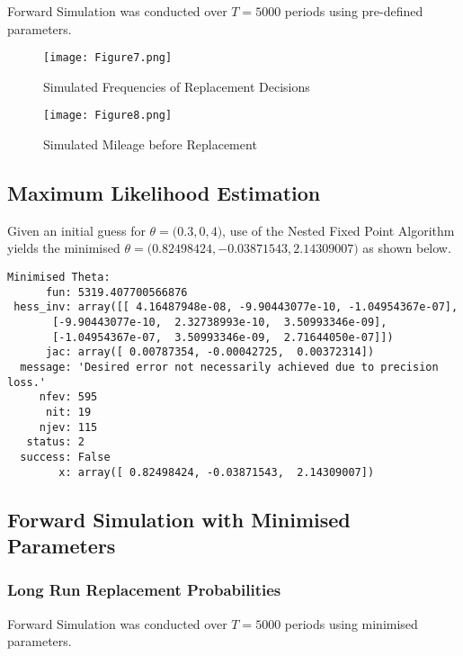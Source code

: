 \documentclass{article}
\begin{document}
Forward Simulation was conducted over $T=5000$ periods using pre-defined parameters.

\begin{figure}[h]
\begin{center}
\texttt{[image: Figure7.png]}
\caption{Simulated Frequencies of Replacement Decisions}
\end{center}
\end{figure}
\FloatBarrier

\begin{figure}[h]
\begin{center}
\texttt{[image: Figure8.png]}
\caption{Simulated Mileage before Replacement}
\end{center}
\end{figure}
\FloatBarrier

\subsection{Maximum Likelihood Estimation}

Given an initial guess for $\theta = \big( 0.3, 0, 4 \big)$, use of the Nested Fixed Point Algorithm yields the minimised $\theta = \big( 0.82498424, -0.03871543,  2.14309007 \big)$ as shown below.

\begin{lstlisting}
Minimised Theta:
      fun: 5319.407700566876
 hess_inv: array([[ 4.16487948e-08, -9.90443077e-10, -1.04954367e-07],
       [-9.90443077e-10,  2.32738993e-10,  3.50993346e-09],
       [-1.04954367e-07,  3.50993346e-09,  2.71644050e-07]])
      jac: array([ 0.00787354, -0.00042725,  0.00372314])
  message: 'Desired error not necessarily achieved due to precision loss.'
     nfev: 595
      nit: 19
     njev: 115
   status: 2
  success: False
        x: array([ 0.82498424, -0.03871543,  2.14309007])
\end{lstlisting}

\subsection{Forward Simulation with Minimised Parameters}

\subsubsection{Long Run Replacement Probabilities}

Forward Simulation was conducted over $T=5000$ periods using minimised parameters.
\end{document}
